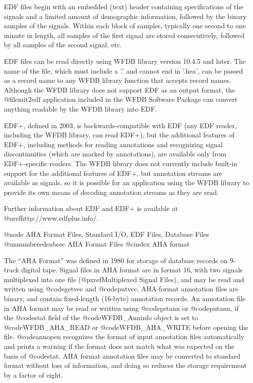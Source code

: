 {{{{{{{{{{{{{{EDF files begin with an embedded (text) header containing specifications of the
signals and a limited amount of demographic information, followed by the binary
samples of the signals.  Within each block of samples, typically one second to
one minute in length, all samples of the first signal are stored consecutively,
followed by all samples of the second signal, etc.

EDF files can be read directly using WFDB library version 10.4.5 and later.
The name of the file, which must include a '.' and cannot end in '.hea', can
be passed as a record name to any WFDB library function that accepts record
names.  Although the WFDB library does not support EDF as an output format, the
@file{mit2edf} application included in the WFDB Software Package can convert
anything readable by the WFDB library into EDF.

EDF+, defined in 2003, is backwards-compatible with EDF (any EDF reader,
including the WFDB library, can read EDF+), but the additional features of
EDF+, including methods for reading annotations and recognizing signal
discontinuities (which are marked by annotations), are available only from
EDF+-specific readers.  The WFDB library does not currently include built-in
support for the additional features of EDF+, but annotation streams are
available as signals, so it is possible for an application using the WFDB
library to provide its own means of decoding annotation streams as they are
read.

Further information about EDF and EDF+ is available at
@uref{http://www.edfplus.info/}.

@node     AHA Format Files, Standard I/O, EDF Files, Database Files
@unnumberedsubsec AHA Format Files
@cindex AHA format

The ``AHA Format'' was defined in 1980 for storage of database records
on 9-track digital tape.  Signal files in AHA format are in format 16,
with two signals multiplexed into one file (@pxref{Multiplexed Signal Files}),
and may be read and written using @code{getvec} and @code{putvec}.
AHA-format annotation files are binary, and contain fixed-length
(16-byte) annotation records.  An annotation file in AHA format may be
read or written using @code{getann} or @code{putann}, if the @code{stat}
field of the @code{WFDB_Anninfo} object is set to @code{WFDB_AHA_READ} or
@code{WFDB_AHA_WRITE} before opening the file.  @code{annopen} recognizes the
format of input annotation files automatically and prints a warning if
the format does not match what was expected on the basis of @code{stat}.
AHA format annotation files may be converted to standard format without
loss of information, and doing so reduces the storage requirement by a
factor of eight.

}}}}}}}}}}}}}}
